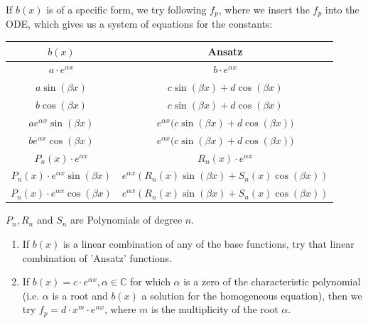 \documentclass[a4paper,fontsize = 8pt]{scrartcl}
\def\C{\mathbb{C}}
\begin{document}
If $b(x)$ is of a specific form, we try following $f_p$, where we insert the $f_p$ into the ODE, which gives us a system of equations for the constants:

\begin{center}
  \renewcommand*{\arraystretch}{1.6}
  \begin{tabular}{cc} 
    \toprule
    $b(x)$ & Ansatz \\ 
    \midrule
    $a \cdot e^{\alpha x}$ & $b \cdot e^{\alpha x}$\\
    $a \sin(\beta x)$ & $c \sin(\beta x) + d \cos(\beta x)$\\
    $b \cos(\beta x)$ & $c \sin(\beta x) + d \cos(\beta x)$\\
    $a e^{\alpha x} \sin(\beta x)$ & $e^{\alpha x} \Big( c \sin(\beta x) + d \cos(\beta x) \Big)$\\
    $b e^{\alpha x} \cos(\beta x)$ & $e^{\alpha x} \Big( c \sin(\beta x) + d \cos(\beta x) \Big)$\\
    $P_n(x) \cdot e^{\alpha x}$ & $R_n(x) \cdot e^{\alpha x}$\\
    $P_n(x) \cdot e^{\alpha x} \sin(\beta x)$ & $e^{\alpha x} \left( R_n(x) \sin(\beta x) + S_n(x) \cos(\beta x) \right)$\\
    $P_n(x) \cdot e^{\alpha x} \cos(\beta x)$ & $e^{\alpha x} \left( R_n(x) \sin(\beta x) + S_n(x) \cos(\beta x) \right)$\\
    \bottomrule
  \end{tabular}
\end{center}

\(P_n, R_n \) and \(S_n\) are Polynomials of degree $n$. 

\begin{enumerate}
  \item If \(b(x)\) is a linear combination of any of the base functions, try that linear combination of 'Ansatz' functions.  
  \item If $b(x) = c \cdot e^{\alpha x}, \alpha \in \C$ for which $\alpha$ is a zero of the characteristic polynomial (i.e. $\alpha$ is a root and $b(x)$ a solution for the homogeneous equation), then we try $f_p = d \cdot x^m \cdot e^{\alpha x}$, where $m$ is the multiplicity of the root $\alpha$.
\end{enumerate}
\end{document}
